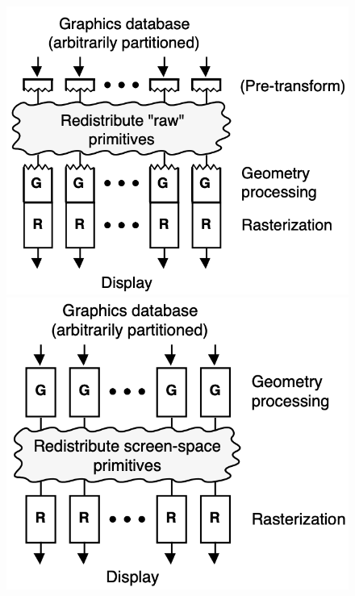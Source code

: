 \begin{figure}[htbp]
  \begin{minipage}[t]{0.32\linewidth}
    \centering
    \includegraphics[keepaspectratio, width=\linewidth]{figures/sort-first.png}
  \end{minipage}
  \begin{minipage}[t]{0.32\linewidth}
    \centering
    \includegraphics[keepaspectratio, width=\linewidth]{figures/sort-middle.png}

\end{minipage}
\end{figure}

